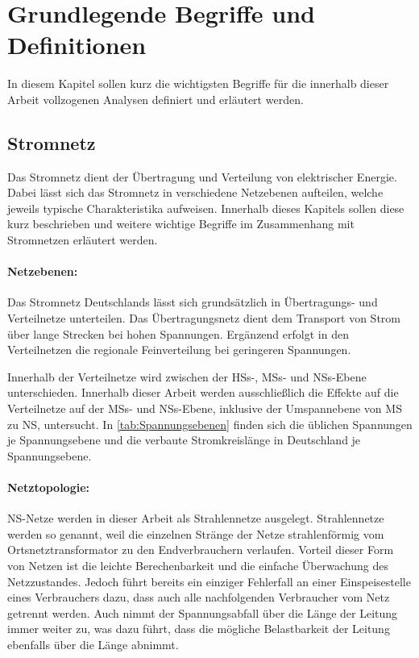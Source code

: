 \section{Grundlegende Begriffe und Definitionen}\label{chap:base_theo}

In diesem Kapitel sollen kurz die wichtigsten Begriffe für die innerhalb dieser Arbeit vollzogenen Analysen definiert und erläutert werden.


\subsection{Stromnetz}\label{chap:theo_grid}

Das Stromnetz dient der Übertragung und Verteilung von elektrischer Energie. \cite{Paschotta2020}
Dabei lässt sich das Stromnetz in verschiedene Netzebenen aufteilen, welche jeweils typische Charakteristika aufweisen.
Innerhalb dieses Kapitels sollen diese kurz beschrieben und weitere wichtige Begriffe im Zusammenhang mit Stromnetzen erläutert werden.


\paragraph{Netzebenen:}

Das Stromnetz Deutschlands lässt sich grundsätzlich in Übertragungs- und Verteilnetze unterteilen.
Das Übertragungsnetz dient dem Transport von Strom über lange Strecken bei hohen Spannungen.
Ergänzend erfolgt in den Verteilnetzen die regionale Feinverteilung bei geringeren Spannungen. \cite{Agora2019}\medskip

Innerhalb der Verteilnetze wird zwischen der \glspl{HS}-, \glspl{MS}- und \glspl{NS}-Ebene unterschieden.
Innerhalb dieser Arbeit werden ausschließlich die Effekte auf die Verteilnetze auf der \glspl{MS}- und \glspl{NS}-Ebene, inklusive der Umspannebene von \gls{MS} zu \gls{NS}, untersucht.
In \autoref{tab:Spannungsebenen} finden sich die üblichen Spannungen je Spannungsebene und die verbaute Stromkreislänge in Deutschland je Spannungsebene.




\paragraph{Netztopologie:}

\gls{NS}-Netze werden in dieser Arbeit als Strahlennetze ausgelegt.
Strahlennetze werden so genannt, weil die einzelnen Stränge der Netze strahlenförmig vom Ortsnetztransformator zu den Endverbrauchern verlaufen. \cite{Agora2019}
Vorteil dieser Form von Netzen ist die leichte Berechenbarkeit und die einfache Überwachung des Netzzustandes.
Jedoch führt bereits ein einziger Fehlerfall an einer Einspeisestelle eines Verbrauchers dazu, dass auch alle nachfolgenden Verbraucher vom Netz getrennt werden.
Auch nimmt der Spannungsabfall über die Länge der Leitung immer weiter zu, was dazu führt, dass die mögliche Belastbarkeit der Leitung ebenfalls über die Länge abnimmt. \cite{WNG2020}\medskip

